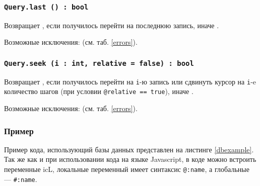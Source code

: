 \subsubsection{\texttt{Query.last () : bool}}

Возвращает \true, если получилось перейти на последнюю запись, иначе \false.

Возможные исключения:  (см. таб. \ref{errors}).

\subsubsection{\texttt{Query.seek (i : int, relative = false) : bool}}

Возвращает \true, если получилось перейти на \texttt{i}-ю запись или сдвинуть курсор на \texttt{i}-e количество шагов (при условии \texttt{@relative == true}), иначе \false.

Возможные исключения:  (см. таб. \ref{errors}).

\subsubsection{Пример}

Пример кода, использующий базы данных представлен на листинге \ref{dbexample}. Так же как и при использовании кода на языке Javascript, в коде можно встроить переменные icL, локальные переменный имеет синтаксис \texttt{@:name}, а глобальные — \texttt{#:name}.

\begin{sourcecode}
	\label{dbexample}
    \inputminted[linenos]{icl}{../sources/dbexample.icL}
\end{sourcecode}

